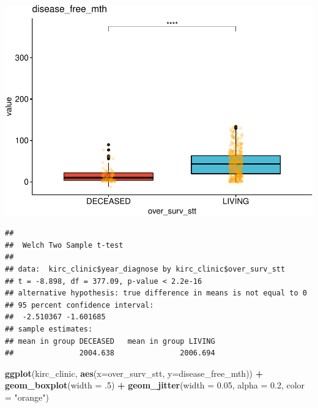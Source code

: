 \documentclass[]{article}
\newenvironment{Shaded}{\begin{snugshade}}{\end{snugshade}}
\newcommand{\KeywordTok}[1]{\textcolor[rgb]{0.13,0.29,0.53}{\textbf{#1}}}
\newcommand{\DataTypeTok}[1]{\textcolor[rgb]{0.13,0.29,0.53}{#1}}
\newcommand{\DecValTok}[1]{\textcolor[rgb]{0.00,0.00,0.81}{#1}}
\newcommand{\FloatTok}[1]{\textcolor[rgb]{0.00,0.00,0.81}{#1}}
\newcommand{\StringTok}[1]{\textcolor[rgb]{0.31,0.60,0.02}{#1}}
\newcommand{\OperatorTok}[1]{\textcolor[rgb]{0.81,0.36,0.00}{\textbf{#1}}}
\newcommand{\NormalTok}[1]{#1}
\begin{document}
\includegraphics{figs/render-unnamed-chunk-12-2.pdf}

\begin{Shaded}
\end{Shaded}

\begin{verbatim}
## 
##  Welch Two Sample t-test
## 
## data:  kirc_clinic$year_diagnose by kirc_clinic$over_surv_stt
## t = -8.898, df = 377.09, p-value < 2.2e-16
## alternative hypothesis: true difference in means is not equal to 0
## 95 percent confidence interval:
##  -2.510367 -1.601685
## sample estimates:
## mean in group DECEASED   mean in group LIVING 
##               2004.638               2006.694
\end{verbatim}

\begin{Shaded}
\begin{Highlighting}[]
\KeywordTok{ggplot}\NormalTok{(kirc_clinic, }\KeywordTok{aes}\NormalTok{(}\DataTypeTok{x=}\NormalTok{over_surv_stt, }\DataTypeTok{y=}\NormalTok{disease_free_mth)) }\OperatorTok{+}
\StringTok{  }\KeywordTok{geom_boxplot}\NormalTok{(}\DataTypeTok{width =}\NormalTok{ .}\DecValTok{5}\NormalTok{) }\OperatorTok{+}
\StringTok{  }\KeywordTok{geom_jitter}\NormalTok{(}\DataTypeTok{width =} \FloatTok{0.05}\NormalTok{, }\DataTypeTok{alpha =} \FloatTok{0.2}\NormalTok{, }\DataTypeTok{color =} \StringTok{"orange"}\NormalTok{)}
\end{Highlighting}
\end{Shaded}
\end{document}
